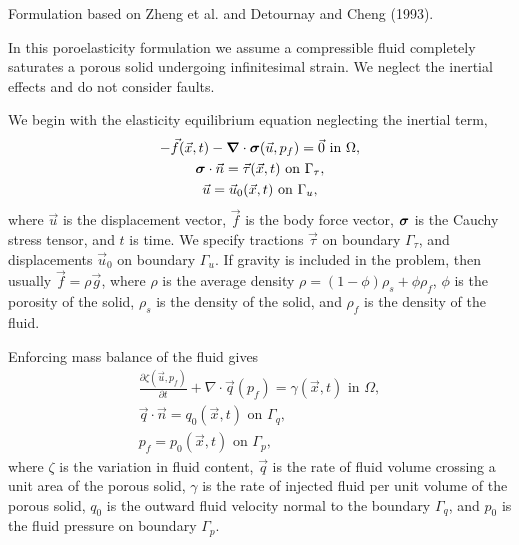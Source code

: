 
Formulation based on Zheng et al. and Detournay and Cheng (1993).

In this poroelasticity formulation we assume a compressible fluid
completely saturates a porous solid undergoing infinitesimal
strain. We neglect the inertial effects and do not consider faults.

We begin with the elasticity equilibrium equation neglecting the inertial term,
\begin{gather}
  - \vec{f}(\vec{x},t) - \tensor{\nabla} \cdot \tensor{\sigma}(\vec{u},p_f) = \vec{0} 
\text{ in }\Omega, \\
%
  \tensor{\sigma} \cdot \vec{n} = \vec{\tau}(\vec{x},t) \text{ on }\Gamma_\tau, \\
%
  \vec{u} = \vec{u}_0(\vec{x},t) \text{ on }\Gamma_u,
\end{gather}
where $\vec{u}$ is the displacement vector, $\vec{f}$ is the body
force vector, $\bm{\sigma}$ is the Cauchy stress tensor, and $t$
is time. We specify tractions $\vec{\tau}$ on boundary $\Gamma_\tau$, and
displacements $\vec{u}_0$ on boundary $\Gamma_u$. If gravity is included in
the problem, then usually $\vec{f} = \rho \vec{g}$, where $\rho$ is
the average density $\rho = (1-\phi)\rho_s + \phi \rho_f$, $\phi$ is
the porosity of the solid, $\rho_s$ is the density of the solid, and
$\rho_f$ is the density of the fluid.

Enforcing mass balance of the fluid gives
\begin{gather}
  \frac{\partial \zeta(\vec{u},p_f)}{\partial t} + \nabla \cdot \vec{q}(p_f) = 
\gamma(\vec{x},t) \text{ in }
\Omega, \\
%
  \vec{q} \cdot \vec{n} = q_0(\vec{x},t) \text{ on }\Gamma_q, \\
%
  p_f = p_0(\vec{x},t) \text{ on }\Gamma_p,
\end{gather}
where $\zeta$ is the variation in fluid content, $\vec{q}$ is the rate
of fluid volume crossing a unit area of the porous solid, $\gamma$ is
the rate of injected fluid per unit volume of the porous solid, $q_0$
is the outward fluid velocity normal to the boundary $\Gamma_q$, and
$p_0$ is the fluid pressure on boundary $\Gamma_p$.

